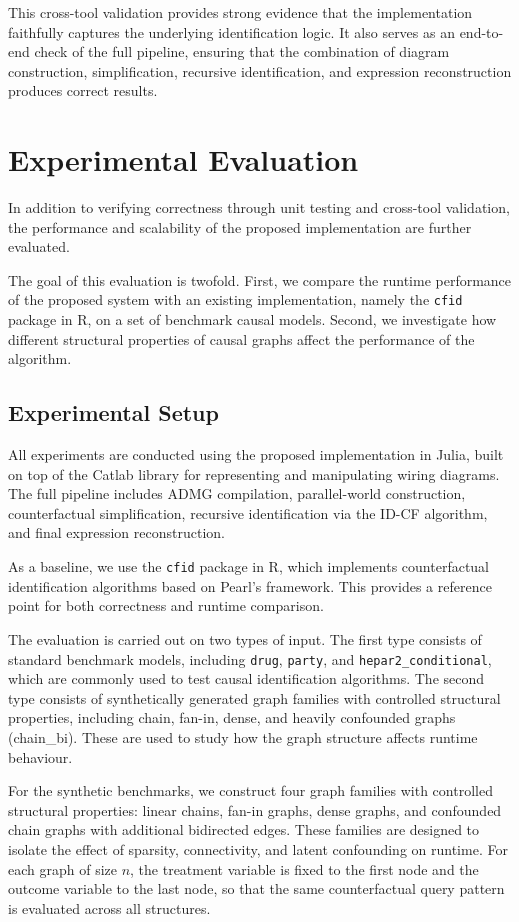 \documentclass[a4paper]{report}
\begin{document}
This cross-tool validation provides strong evidence that the implementation faithfully captures the underlying identification logic. It also serves as an end-to-end check of the full pipeline, ensuring that the combination of diagram construction, simplification, recursive identification, and expression reconstruction produces correct results.

\section{Experimental Evaluation}
In addition to verifying correctness through unit testing and cross-tool validation, the performance and scalability of the proposed implementation are further evaluated.

The goal of this evaluation is twofold. First, we compare the runtime performance of the proposed system with an existing implementation, namely the \texttt{cfid} package in R, on a set of benchmark causal models. Second, we investigate how different structural properties of causal graphs affect the performance of the algorithm.

\subsection{Experimental Setup}
All experiments are conducted using the proposed implementation in Julia, built on top of the Catlab library for representing and manipulating wiring diagrams.
The full pipeline includes ADMG compilation, parallel-world construction, counterfactual simplification, recursive identification via the ID-CF algorithm, and final expression reconstruction.

As a baseline, we use the \texttt{cfid} package in R, which implements counterfactual identification algorithms based on Pearl’s framework. This provides a reference point for both correctness and runtime comparison.

The evaluation is carried out on two types of input.
The first type consists of standard benchmark models, including \texttt{drug}, \texttt{party}, and \texttt{hepar2\_conditional}, which are commonly used to test causal identification algorithms.
The second type consists of synthetically generated graph families with controlled structural properties, including chain, fan-in, dense, and heavily confounded graphs (chain\_bi).
These are used to study how the graph structure affects runtime behaviour.

For the synthetic benchmarks, we construct four graph families with controlled structural properties: linear chains, fan-in graphs, dense graphs, and confounded chain graphs with additional bidirected edges. These families are designed to isolate the effect of sparsity, connectivity, and latent confounding on runtime. For each graph of size $n$, the treatment variable is fixed to the first node and the outcome variable to the last node, so that the same counterfactual query pattern is evaluated across all structures.
\end{document}
